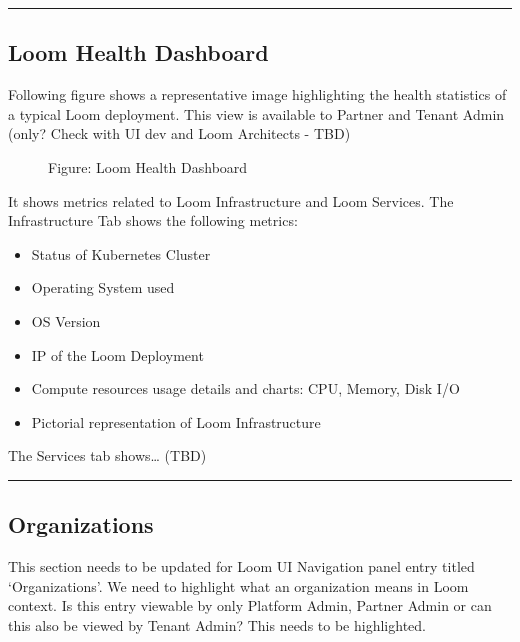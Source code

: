 \documentclass[letterpaper,10pt,english]{sphinxmanual}
\begin{document}
\bigskip\hrule\bigskip



\subsection{Loom Health Dashboard}
\label{\detokenize{loom_getting_started_guide:loom-health-dashboard}}
Following figure shows a representative image highlighting the health statistics of a typical Loom deployment.  This view is available to Partner and Tenant Admin (only? Check with UI dev and Loom Architects - TBD)

\begin{figure}[htbp]
\centering
\capstart

\noindent{}
\caption{Figure: Loom Health Dashboard}\label{\detokenize{loom_getting_started_guide:id28}}\end{figure}

It shows metrics related to Loom Infrastructure and Loom Services.  The Infrastructure Tab shows the following metrics:
\begin{itemize}
\item {} 
Status of Kubernetes Cluster

\item {} 
Operating System used

\item {} 
OS Version

\item {} 
IP of the Loom Deployment

\item {} 
Compute resources usage details and charts: CPU, Memory, Disk I/O

\item {} 
Pictorial representation of Loom Infrastructure

\end{itemize}

The Services tab shows… (TBD)


\bigskip\hrule\bigskip



\subsection{Organizations}
\label{\detokenize{loom_getting_started_guide:organizations}}
This section needs to be updated for Loom UI Navigation panel entry titled ‘Organizations’. We need to highlight what an organization means in Loom context.  Is this entry viewable by only Platform Admin, Partner Admin or can this also be viewed by Tenant Admin? This needs to be highlighted.
\end{document}
